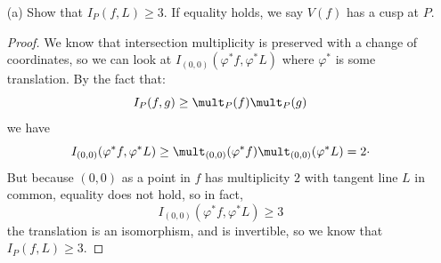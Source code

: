 \documentclass{article}
\begin{document}
    \begin{itemize}
        \item [(a)] Show that $I_{P}(f, L) \geq 3$. If equality holds, we say $V(f)$ has a cusp at $P$.
            \begin{proof}
                We know that intersection multiplicity is preserved with a change of coordinates, so we can look at $I_{(0, 0)}(\varphi^{*}f, \varphi^{*}L)$ where $\varphi^{*}$ is some translation. By the fact that:
                    \begin{equation*}
                        I_{P}(f, g) \geq \mult_{P}(f)\mult_{P}(g)
                    \end{equation*}
                we have
                    \begin{equation*}
                        I_{(0, 0)}(\varphi^{*}f, \varphi^{*}L) \geq \mult_{(0, 0)}(\varphi^{*}f)\mult_{(0, 0)}(\varphi^{*}L) = 2 \cdot
                    \end{equation*}
                But because $(0, 0)$ as a point in $f$ has multiplicity $2$ with tangent line $L$ in common, equality does not hold, so in fact,
                    \begin{equation*}
                        I_{(0, 0)}(\varphi^{*}f, \varphi^{*}L) \geq3
                    \end{equation*}
                the translation is an isomorphism, and is invertible, so we know that $I_{P}(f, L) \geq3$.
            \end{proof}


\end{itemize}
\end{document}
